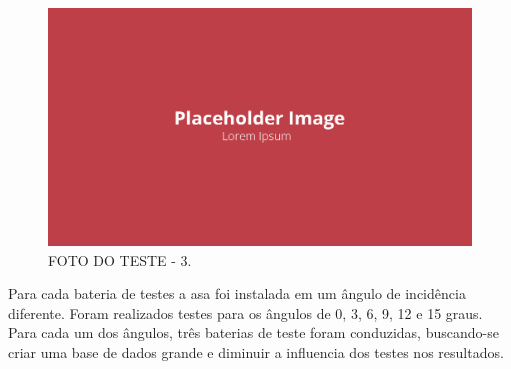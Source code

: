\begin{figure}[!ht]
    \centering
    \includegraphics[width=.8\linewidth]{figuras/outras/placeholder.png}
    \caption{FOTO DO TESTE - 3\cite{autor}.}
    \label{fig:placeholder}
\end{figure}

Para cada bateria de testes a asa foi instalada em um ângulo de incidência diferente. Foram realizados testes para os ângulos de 0, 3, 6, 9, 12 e 15 graus. Para cada um dos ângulos, três baterias de teste foram conduzidas, buscando-se criar uma base de dados grande e diminuir a influencia dos testes nos resultados.

